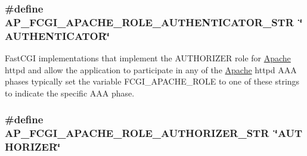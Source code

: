 \subsubsection[{\texorpdfstring{A\+P\+\_\+\+F\+C\+G\+I\+\_\+\+A\+P\+A\+C\+H\+E\+\_\+\+R\+O\+L\+E\+\_\+\+A\+U\+T\+H\+E\+N\+T\+I\+C\+A\+T\+O\+R\+\_\+\+S\+TR}{AP_FCGI_APACHE_ROLE_AUTHENTICATOR_STR}}]{\setlength{\rightskip}{0pt plus 5cm}\#define A\+P\+\_\+\+F\+C\+G\+I\+\_\+\+A\+P\+A\+C\+H\+E\+\_\+\+R\+O\+L\+E\+\_\+\+A\+U\+T\+H\+E\+N\+T\+I\+C\+A\+T\+O\+R\+\_\+\+S\+TR~\char`\"{}A\+U\+T\+H\+E\+N\+T\+I\+C\+A\+T\+OR\char`\"{}}\hypertarget{group__APACHE__CORE__FASTCGI_ga0485d7ed5e027bd3e0afb3a65b0e75d9}{}\label{group__APACHE__CORE__FASTCGI_ga0485d7ed5e027bd3e0afb3a65b0e75d9}
Fast\+C\+GI implementations that implement the A\+U\+T\+H\+O\+R\+I\+Z\+ER role for \hyperlink{namespaceApache}{Apache} httpd and allow the application to participate in any of the \hyperlink{namespaceApache}{Apache} httpd A\+AA phases typically set the variable F\+C\+G\+I\+\_\+\+A\+P\+A\+C\+H\+E\+\_\+\+R\+O\+LE to one of these strings to indicate the specific A\+AA phase. 
\subsubsection[{\texorpdfstring{A\+P\+\_\+\+F\+C\+G\+I\+\_\+\+A\+P\+A\+C\+H\+E\+\_\+\+R\+O\+L\+E\+\_\+\+A\+U\+T\+H\+O\+R\+I\+Z\+E\+R\+\_\+\+S\+TR}{AP_FCGI_APACHE_ROLE_AUTHORIZER_STR}}]{\setlength{\rightskip}{0pt plus 5cm}\#define A\+P\+\_\+\+F\+C\+G\+I\+\_\+\+A\+P\+A\+C\+H\+E\+\_\+\+R\+O\+L\+E\+\_\+\+A\+U\+T\+H\+O\+R\+I\+Z\+E\+R\+\_\+\+S\+TR~\char`\"{}A\+U\+T\+H\+O\+R\+I\+Z\+ER\char`\"{}}\hypertarget{group__APACHE__CORE__FASTCGI_gabbab8df2aea015014f50e02e2b658074}{}\label{group__APACHE__CORE__FASTCGI_gabbab8df2aea015014f50e02e2b658074}
